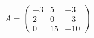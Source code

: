 \begin{multicols}{3}
\begin{enumtasks}
			\item \( A = \begin{pmatrix} -3 & 5 & -3 \\ 2 & 0 & -3 \\ 0 & 15 & -10 \end{pmatrix} \) %
			
		\end{enumtasks}
	\end{multicols}

